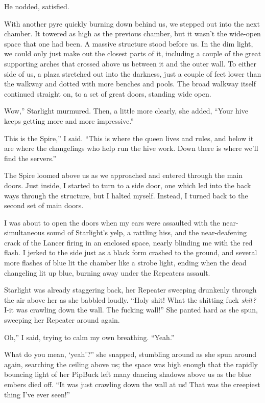 He nodded, satisfied.

With another pyre quickly burning down behind us, we stepped out into the next chamber. It towered as high as the previous chamber, but it wasn’t the wide-open space that one had been. A massive structure stood before us. In the dim light, we could only just make out the closest parts of it, including a couple of the great supporting arches that crossed above us between it and the outer wall. To either side of us, a plaza stretched out into the darkness, just a couple of feet lower than the walkway and dotted with more benches and pools. The broad walkway itself continued straight on, to a set of great doors, standing wide open.

\leavevmode{}Wow,” Starlight murmured. Then, a little more clearly, she added, “Your hive keeps getting more and more impressive.”

\leavevmode{}This is the Spire,” I said. “This is where the queen lives and rules, and below it are where the changelings who help run the hive work. Down there is where we’ll find the servers.”

The Spire loomed above us as we approached and entered through the main doors. Just inside, I started to turn to a side door, one which led into the back ways through the structure, but I halted myself. Instead, I turned back to the second set of main doors.

I was about to open the doors when my ears were assaulted with the near-simultaneous sound of Starlight’s yelp, a rattling hiss, and the near-deafening crack of the Lancer firing in an enclosed space, nearly blinding me with the red flash. I jerked to the side just as a black form crashed to the ground, and several more flashes of blue lit the chamber like a strobe light, ending when the dead changeling lit up blue, burning away under the Repeaters assault.

Starlight was already staggering back, her Repeater sweeping drunkenly through the air above her as she babbled loudly. “Holy shit! What the shitting fuck \textit{shit?} I-it was crawling down the wall. The fucking wall!” She panted hard as she spun, sweeping her Repeater around again.

\leavevmode{}Oh,” I said, trying to calm my own breathing. “Yeah.”

\leavevmode{}What do you mean, ‘yeah’?” she snapped, stumbling around as she spun around again, searching the ceiling above us; the space was high enough that the rapidly bouncing light of her PipBuck left many dancing shadows above us as the blue embers died off. “It was just crawling down the wall at us! That was the creepiest thing I’ve ever seen!”

